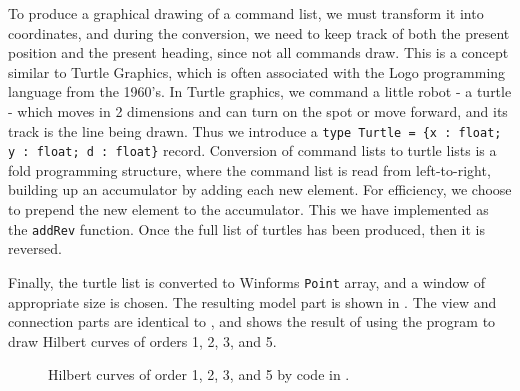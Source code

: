 To produce a graphical drawing of a command list, we must transform it into coordinates, and during the conversion, we need to keep track of both the present position and the present heading, since not all commands draw. This is a concept similar to Turtle Graphics, which is often associated with the Logo programming language from the 1960's. In Turtle graphics, we command a little robot - a turtle - which moves in 2 dimensions and can turn on the spot or move forward, and its track is the line being drawn. Thus we introduce a \lstinline!type Turtle = {x : float; y : float; d : float}! record. Conversion of command lists to turtle lists is a fold programming structure, where the command list is read from left-to-right, building up an accumulator by adding each new element. For efficiency, we choose to prepend the new element to the accumulator. This we have implemented as the \lstinline{addRev} function. Once the full list of turtles has been produced, then it is reversed.

Finally, the turtle list is converted to Winforms \lstinline{Point} array, and a window of appropriate size is chosen. The resulting model part is shown in . The view and connection parts are identical to , and  shows the result of using the program to draw Hilbert curves of orders 1, 2, 3, and 5.
%
%
\begin{figure}
  \centering
  \caption{Hilbert curves of order 1, 2, 3, and 5 by code in .}
  \label{fig:hilbert}
\end{figure}
\clearpage %

